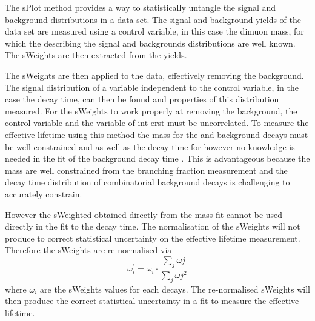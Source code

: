 The sPlot method provides a way to statistically untangle the signal and background distributions in a data set. %
The signal and background yields of the data set are measured using a control variable, in this case the dimuon mass, for which the \pdfs describing the signal and backgrounds distributions are well known. The sWeights are then extracted from the yields.



The sWeights are then applied to the data, effectively removing the background. The signal distribution of a variable independent to the control variable, in the case the decay time, can then be found and properties of this distribution measured. For the sWeights to work properly at removing the background, the control variable and the variable of int erst must be uncorrelated.
 To measure the \bsmumu effective lifetime using this method the mass \pdfs for the \bsmumu and background decays must be well constrained and as well as the decay time \pdf for \bsmumu however no knowledge is needed in the fit of the background decay time \pdf. This is advantageous because the mass \pdfs are well constrained from the branching fraction measurement and the decay time distribution of combinatorial background decays is challenging to accurately constrain. 

However the sWeighted obtained directly from the mass fit cannot be used directly in the \ml fit to the decay time. The normalisation of the sWeights will not produce to correct statistical uncertainty on the effective lifetime measurement. Therefore the sWeights are re-normalised via
\begin{equation}
\omega^{'}_{i}= \omega_{i} \cdot \frac{\displaystyle\sum_{j} \omega{j}}{\displaystyle\sum_{j} \omega{j}^{2}}
\end{equation}
where $\omega_{i}$ are the sWeights values for each decays. The re-normalised sWeights will then produce the correct statistical uncertainty in a \ml fit to measure the \bsmumu effective lifetime.

